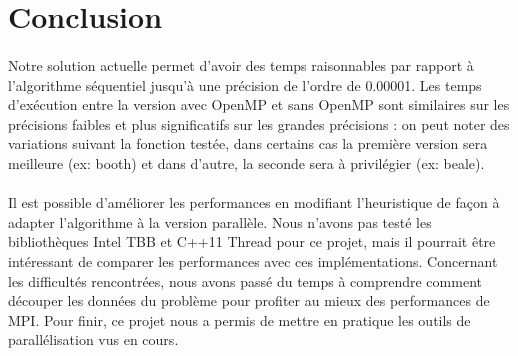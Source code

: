\documentclass[11pt]{article}
\begin{document}

\FloatBarrier


\FloatBarrier

\section{Conclusion}
    \paragraph{}
    Notre solution actuelle permet d'avoir des temps raisonnables par rapport à l'algorithme séquentiel jusqu'à une précision de l'ordre de 0.00001. Les temps d'exécution entre la version avec OpenMP et sans OpenMP sont similaires sur les précisions faibles et plus significatifs sur les grandes précisions : on peut noter des variations suivant la fonction testée, dans certains cas la première version sera meilleure (ex: booth) et dans d'autre, la seconde sera à privilégier (ex: beale).
    
    \paragraph{}
    Il est possible d'améliorer les performances en modifiant l'heuristique de façon à adapter l'algorithme à la version parallèle. Nous n'avons pas testé les bibliothèques Intel TBB et C++11 Thread pour ce projet, mais il pourrait être intéressant de comparer les performances avec ces implémentations. Concernant les difficultés rencontrées, nous avons passé du temps à comprendre comment découper les données du problème pour profiter au mieux des performances de MPI. Pour finir, ce projet nous a permis de mettre en pratique les outils de parallélisation vus en cours.
\end{document}
